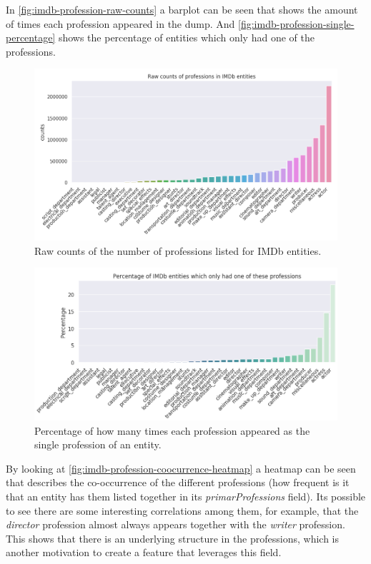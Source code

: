 \documentclass[epsfig,a4paper,11pt,titlepage,twoside,openany]{book}
\begin{document}
In \autoref{fig:imdb-profession-raw-counts} a barplot can be seen that shows the amount of times each profession appeared in the dump. And \autoref{fig:imdb-profession-single-percentage} shows the percentage of entities which only had one of the professions.

\begin{figure}[]
  \centering \includegraphics[width=\textwidth]{raw_profession_counts_imdb}
  \caption{Raw counts of the number of professions listed for IMDb entities.}
  \label{fig:imdb-profession-raw-counts}
\end{figure}


\begin{figure}[]
  \centering \includegraphics[width=\textwidth]{imdb_percentage_single_professions}
  \caption{Percentage of how many times each profession appeared as the single profession of an entity.}
  \label{fig:imdb-profession-single-percentage}
\end{figure}


By looking at \autoref{fig:imdb-profession-coocurrence-heatmap} a heatmap can be seen that describes the co-occurrence of the different professions (how frequent is it that an entity has them listed together in its \textit{primarProfessions} field). Its possible to see there are some interesting correlations among them, for example, that the \textit{director} profession almost always appears together with the \textit{writer} profession. This shows that there is an underlying structure in the professions, which is another motivation to create a feature that leverages this field.
\end{document}
